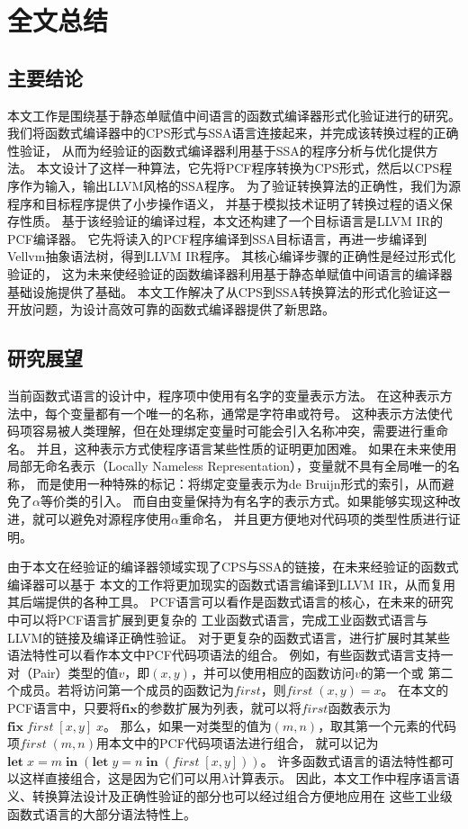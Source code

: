 
\chapter{全文总结} \label{ch:summary}

\section{主要结论}

本文工作是围绕基于静态单赋值中间语言的函数式编译器形式化验证进行的研究。
我们将函数式编译器中的CPS形式与SSA语言连接起来，并完成该转换过程的正确性验证，
从而为经验证的函数式编译器利用基于SSA的程序分析与优化提供方法。
本文设计了这样一种算法，它先将PCF程序转换为CPS形式，然后以CPS程序作为输入，输出LLVM风格的SSA程序。
为了验证转换算法的正确性，我们为源程序和目标程序提供了小步操作语义，
并基于模拟技术证明了转换过程的语义保存性质。
基于该经验证的编译过程，本文还构建了一个目标语言是LLVM IR的PCF编译器。
它先将读入的PCF程序编译到SSA目标语言，再进一步编译到Vellvm抽象语法树，得到LLVM IR程序。
其核心编译步骤的正确性是经过形式化验证的，
这为未来使经验证的函数编译器利用基于静态单赋值中间语言的编译器基础设施提供了基础。
本文工作解决了从CPS到SSA转换算法的形式化验证这一开放问题，为设计高效可靠的函数式编译器提供了新思路。

\section{研究展望}

当前函数式语言的设计中，程序项中使用有名字的变量表示方法。
在这种表示方法中，每个变量都有一个唯一的名称，通常是字符串或符号。
这种表示方法使代码项容易被人类理解，但在处理绑定变量时可能会引入名称冲突，需要进行重命名。
并且，这种表示方式使程序语言某些性质的证明更加困难。
如果在未来使用局部无命名表示（Locally Nameless Representation），变量就不具有全局唯一的名称，
而是使用一种特殊的标记：将绑定变量表示为de Bruijn形式的索引，从而避免了$\alpha$等价类的引入。
而自由变量保持为有名字的表示方式。如果能够实现这种改进，就可以避免对源程序使用$\alpha$重命名，
并且更方便地对代码项的类型性质进行证明。

由于本文在经验证的编译器领域实现了CPS与SSA的链接，在未来经验证的函数式编译器可以基于
本文的工作将更加现实的函数式语言编译到LLVM IR，从而复用其后端提供的各种工具。
PCF语言可以看作是函数式语言的核心，在未来的研究中可以将PCF语言扩展到更复杂的
工业函数式语言，完成工业函数式语言与LLVM的链接及编译正确性验证。
对于更复杂的函数式语言，进行扩展时其某些语法特性可以看作本文中PCF代码项语法的组合。
例如，有些函数式语言支持一对（Pair）类型的值$v$，即$(x,y)$，并可以使用相应的函数访问$v$的第一个或
第二个成员。若将访问第一个成员的函数记为$first$，则$first\; (x,y)=x$。
在本文的PCF语言中，只要将$\mathbf{fix}$的参数扩展为列表，就可以将$first$函数表示为
$\mathbf{fix}\; first\; [x,y]\; x$。
那么，如果一对类型的值为$(m,n)$，取其第一个元素的代码项$first\; (m,n)$用本文中的PCF代码项语法进行组合，
就可以记为
$\mathbf{let}\; x=m\; \mathbf{in}\; (\mathbf{let}\; y=n\; \mathbf{in}\; (first\; [x, y]))$。
许多函数式语言的语法特性都可以这样直接组合，这是因为它们可以用$\lambda$计算表示。
因此，本文工作中程序语言语义、转换算法设计及正确性验证的部分也可以经过组合方便地应用在
这些工业级函数式语言的大部分语法特性上。

